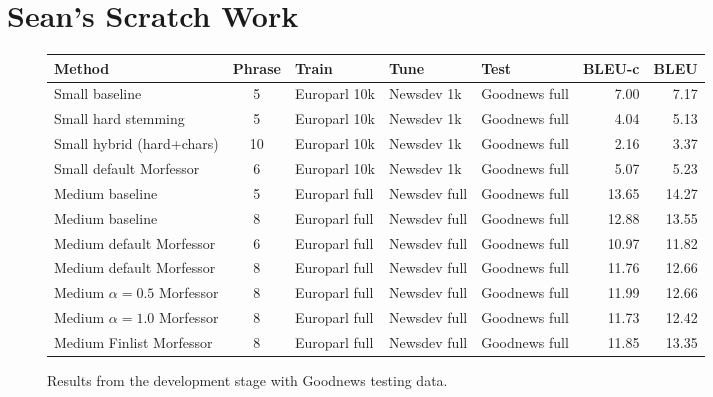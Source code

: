 \section{Sean's Scratch Work}

\begin{figure*}
    \begin{center}
        \begin{tabular}{lclllrr}
            \hline
            \textbf{Method} & \textbf{Phrase} & \textbf{Train} & \textbf{Tune} &
            \textbf{Test} & \textbf{BLEU-c} & \textbf{BLEU} \\
            \hline
            Small baseline & 5 & Europarl 10k & Newsdev 1k & Goodnews full &
            7.00 & 7.17 \\
            \hline
            Small hard stemming & 5 & Europarl 10k & Newsdev 1k & Goodnews full
            & 4.04 & 5.13 \\
            Small hybrid (hard+chars) & 10 & Europarl 10k & Newsdev 1k & Goodnews full & 2.16
            & 3.37 \\
            Small default Morfessor & 6 & Europarl 10k & Newsdev 1k & Goodnews
            full & 5.07 & 5.23 \\
            \hline
            Medium baseline & 5 & Europarl full & Newsdev full & Goodnews full &
            13.65 & 14.27 \\
            Medium baseline & 8 & Europarl full & Newsdev full & Goodnews full &
            12.88 & 13.55 \\
            \hline
            Medium default Morfessor & 6 & Europarl full & Newsdev full &
            Goodnews full & 10.97 & 11.82 \\
            Medium default Morfessor & 8 & Europarl full & Newsdev full &
            Goodnews full & 11.76 & 12.66 \\
            Medium $\alpha=0.5$ Morfessor & 8 & Europarl full & Newsdev full &
            Goodnews full & 11.99 & 12.66 \\
            Medium $\alpha=1.0$ Morfessor & 8 & Europarl full & Newsdev full &
            Goodnews full & 11.73 & 12.42\\
            Medium Finlist Morfessor & 8 & Europarl full & Newsdev full &
            Goodnews full & 11.85 & 13.35 \\
            \hline
        \end{tabular}
    \caption{Results from the development stage with Goodnews testing data.}
    \label{fig:sean-dev}
    \end{center}
\end{figure*}


